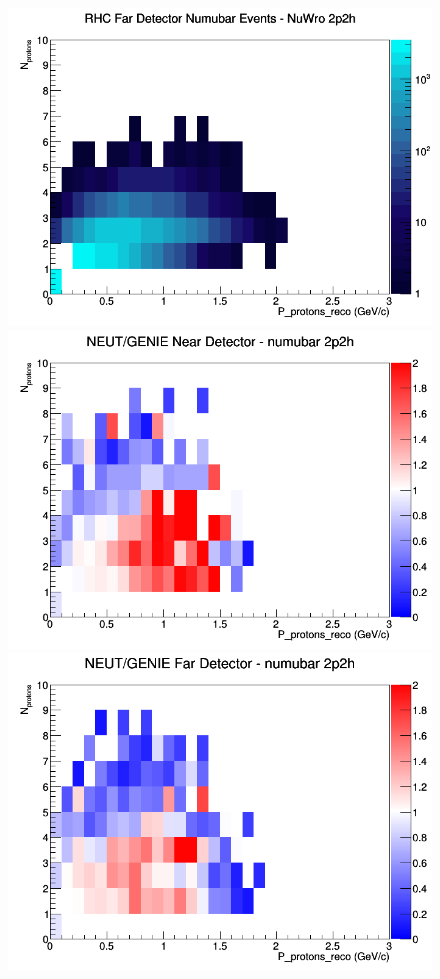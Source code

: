 \documentclass[12pt]{article}
\begin{document}
\begin{figure}[h]
\endminipage
{}
\includegraphics[width=\linewidth]{eff_N_P/LAr/protons/2p2h_RHC_FD_numubar_N_P_NuWro.png}
\endminipage
\newline
{}
\includegraphics[width=\linewidth]{eff_N_P/LAr/protons/ratios/2p2h_NEUT_GENIE_numubar_near_N_P.png}
\endminipage
{}
\includegraphics[width=\linewidth]{eff_N_P/LAr/protons/ratios/2p2h_NEUT_GENIE_numubar_far_N_P.png}

\end{figure}
\end{document}
